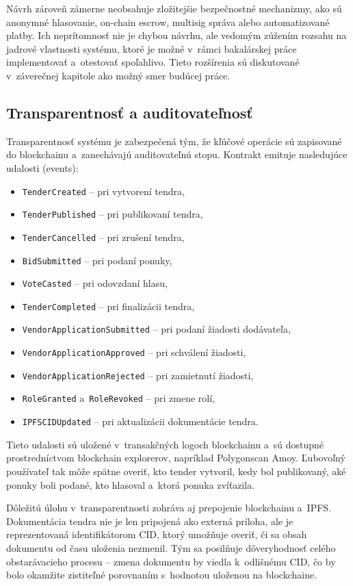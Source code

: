 Návrh zároveň zámerne neobsahuje zložitejšie bezpečnostné mechanizmy,
ako sú anonymné hlasovanie, on-chain escrow, multisig správa alebo
automatizované platby. Ich neprítomnosť nie je chybou návrhu, ale vedomým
zúžením rozsahu na jadrové vlastnosti systému, ktoré je možné v~rámci
bakalárskej práce implementovať a~otestovať spoľahlivo. Tieto rozšírenia
sú diskutované v~záverečnej kapitole ako možný smer budúcej práce.

\subsection{Transparentnosť a auditovateľnosť}
\label{subsec:transparency}

Transparentnosť systému je zabezpečená tým, že kľúčové operácie sú
zapisované do blockchainu a~zanechávajú auditovateľnú stopu. Kontrakt
emituje nasledujúce udalosti (events):
\begin{itemize}
    \item \texttt{TenderCreated} -- pri vytvorení tendra,
    \item \texttt{TenderPublished} -- pri publikovaní tendra,
    \item \texttt{TenderCancelled} -- pri zrušení tendra,
    \item \texttt{BidSubmitted} -- pri podaní ponuky,
    \item \texttt{VoteCasted} -- pri odovzdaní hlasu,
    \item \texttt{TenderCompleted} -- pri finalizácii tendra,
    \item \texttt{VendorApplicationSubmitted} -- pri podaní žiadosti
    dodávateľa,
    \item \texttt{VendorApplicationApproved} -- pri schválení žiadosti,
    \item \texttt{VendorApplicationRejected} -- pri zamietnutí žiadosti,
    \item \texttt{RoleGranted} a~\texttt{RoleRevoked} -- pri zmene rolí,
    \item \texttt{IPFSCIDUpdated} -- pri aktualizácii dokumentácie tendra.
\end{itemize}

Tieto udalosti sú uložené v~transakčných logoch blockchainu a~sú
dostupné prostredníctvom blockchain explorerov, napríklad Polygonscan
Amoy. Ľubovoľný používateľ tak môže spätne overiť, kto tender vytvoril,
kedy bol publikovaný, aké ponuky boli podané, kto hlasoval a~ktorá
ponuka zvíťazila.

Dôležitú úlohu v~transparentnosti zohráva aj prepojenie blockchainu
a~IPFS. Dokumentácia tendra nie je len pripojená ako externá príloha,
ale je reprezentovaná identifikátorom CID, ktorý umožňuje overiť, či
sa obsah dokumentu od času uloženia nezmenil. Tým sa posilňuje
dôveryhodnosť celého obstarávacieho procesu -- zmena dokumentu by viedla
k~odlišnému CID, čo by bolo okamžite zistiteľné porovnaním s~hodnotou
uloženou na blockchaine.

